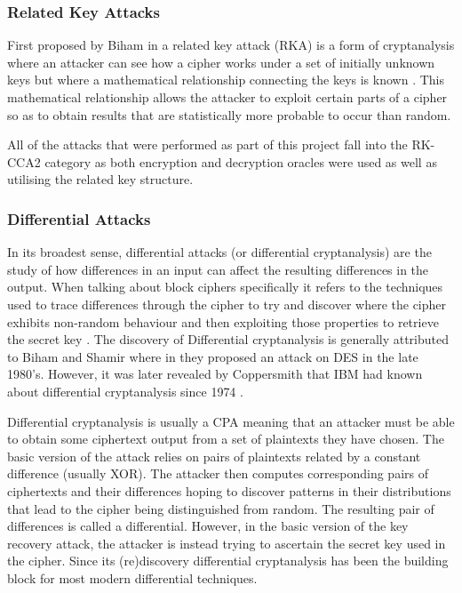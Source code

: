 \documentclass[10pt,journal,compsoc]{IEEEtran}
\begin{document}
\subsubsection{Related Key Attacks}
First proposed by Biham in \cite{jofc-1994-14102} a related key attack (RKA) is a form of cryptanalysis where an attacker can see how a cipher works under a set of initially unknown keys but where a mathematical relationship connecting the keys is known \cite{cryptoeprint:2016/1171-2}. This mathematical relationship allows the attacker to exploit certain parts of a cipher so as to obtain results that are statistically more probable to occur than random.

All of the attacks that were performed as part of this project fall into the RK-CCA2 category as both encryption and decryption oracles were used as well as utilising the related key structure.

\subsubsection{Differential Attacks}
In its broadest sense, differential attacks (or differential cryptanalysis) are the study of how differences in an input can affect the resulting differences in the output. When talking about block ciphers specifically it refers to the techniques used to trace differences through the cipher to try and discover where the cipher exhibits non-random behaviour and then exploiting those properties to retrieve the secret key \cite{10.1007/3-540-38424-3_1}. The discovery of Differential cryptanalysis is generally attributed to Biham and Shamir where in \cite{10.1007/3-540-38424-3_1} they proposed an attack on DES in the late 1980’s. However, it was later revealed by Coppersmith that IBM had known about differential cryptanalysis since 1974 \cite{5389567}. 

Differential cryptanalysis is usually a CPA meaning that an attacker must be able to obtain some ciphertext output from a set of plaintexts they have chosen. The basic version of the attack relies on pairs of plaintexts related by a constant difference (usually XOR). The attacker then computes corresponding pairs of ciphertexts and their differences hoping to discover patterns in their distributions that lead to the cipher being distinguished from random. The resulting pair of differences is called a differential. However, in the basic version of the key recovery attack, the attacker is instead trying to ascertain the secret key used in the cipher. Since its (re)discovery differential cryptanalysis has been the building block for most modern differential techniques.
\end{document}
